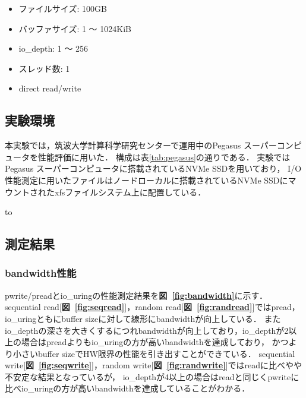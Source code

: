 \documentclass[a4paper,11pt,openany]{jreport}
\newcommand\figref[1]{\textbf{図~\ref{fig:#1}}}
\begin{document}
\begin{itemize}
	\item ファイルサイズ: 100GB
	\item バッファサイズ: 1 〜 1024KiB
	\item io\_depth: 1 〜 256
	\item スレッド数: 1
	\item direct read/write
\end{itemize}

\subsection{実験環境}
本実験では，筑波大学計算科学研究センターで運用中のPegasus スーパーコンピュータを性能評価に用いた．
構成は表\ref{tab:pegasus}の通りである．
実験ではPegasus スーパーコンピュータに搭載されているNVMe SSDを用いており，
I/O性能測定に用いたファイルはノードローカルに搭載されているNVMe SSDにマウントされたxfsファイルシステム上に配置している．


\begin{table}[ht!]
	\centering
	\caption{Pegasus システムの概要}
	\label{tab:pegasus}
	\hbox to 
\end{table}

\subsection{測定結果}
\subsubsection{bandwidth性能}
pwrite/preadとio\_uringの性能測定結果を\figref{bandwidth}に示す．
sequential read[\figref{seqread}]，random read[\figref{randread}]ではpread，io\_uringともにbuffer sizeに対して線形にbandwidthが向上している．
またio\_depthの深さを大きくするにつれbandwidthが向上しており，io\_depthが2以上の場合はpreadよりもio\_uringの方が高いbandwidthを達成しており，
かつより小さいbuffer sizeでHW限界の性能を引き出すことができている．
sequential write[\figref{seqwrite}]，random write[\figref{randwrite}]ではreadに比べやや不安定な結果となっているが，
io\_depthが4以上の場合はreadと同じくpwriteに比べio\_uringの方が高いbandwidthを達成していることがわかる．
\end{document}
